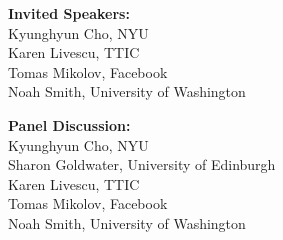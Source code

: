 \documentclass[11pt]{article}
\begin{document}
\begin{description}
\vspace{3mm}
\item{\bf Invited Speakers:}\vspace{2mm} \\
Kyunghyun Cho, NYU \\
Karen Livescu, TTIC \\
Tomas Mikolov, Facebook \\
Noah Smith, University of Washington

\vspace{3mm}
\item{\bf Panel Discussion:}\vspace{2mm} \\
Kyunghyun Cho, NYU \\
Sharon Goldwater, University of Edinburgh \\
Karen Livescu, TTIC \\
Tomas Mikolov, Facebook \\
Noah Smith, University of Washington 


\end{description}
\end{document}
